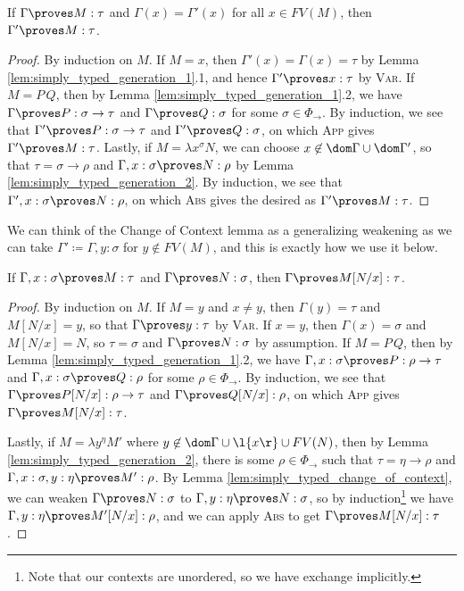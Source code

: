 \documentclass[reqno]{amsart}
\begin{document}
    \begin{lemma}\label{lem:simply_typed_change_of_context}
        If $\Gamma\proves M:\tau$ and $\Gamma(x)=\Gamma'(x)$ for all $x\in FV(M)$, then $\Gamma'\proves M:\tau$.
    \end{lemma}
    \begin{proof}
        By induction on $M$. If $M=x$, then $\Gamma'(x)=\Gamma(x)=\tau$ by Lemma \ref{lem:simply_typed_generation_1}.1, and hence $\Gamma'\proves x:\tau$ by \textsc{Var}. If $M=P\,Q$, then by Lemma \ref{lem:simply_typed_generation_1}.2, we have $\Gamma\proves P:\sigma\rightarrow\tau$ and $\Gamma\proves Q:\sigma$ for some $\sigma\in\Phi_\rightarrow$. By induction, we see that $\Gamma'\proves P:\sigma\to\tau$ and $\Gamma'\proves Q:\sigma$, on which \textsc{App} gives $\Gamma'\proves M:\tau$. Lastly, if $M=\lambda x^\sigma N$, we can choose $x\not\in\dom\Gamma\cup\dom\Gamma'$, so that $\tau=\sigma\rightarrow\rho$ and $\Gamma,x:\sigma\proves N:\rho$ by Lemma \ref{lem:simply_typed_generation_2}. By induction, we see that $\Gamma',x:\sigma\proves N:\rho$, on which \textsc{Abs} gives the desired as $\Gamma'\proves M:\tau$.
    \end{proof}

    We can think of the Change of Context lemma as a generalizing weakening as we can take $\Gamma'\coloneqq\Gamma,y:\sigma$ for $y\not\in FV(M)$, and this is exactly how we use it below.

    \begin{lemma}\label{lem:simply_typed_substitution}
        If $\Gamma,x:\sigma\proves M:\tau$ and $\Gamma\proves N:\sigma$, then $\Gamma\proves M[N/x]:\tau$.
    \end{lemma}
    \begin{proof}
        By induction on $M$. If $M=y$ and $x\neq y$, then $\Gamma(y)=\tau$ and $M[N/x]=y$, so that $\Gamma\proves y:\tau$ by \textsc{Var}. If $x=y$, then $\Gamma(x)=\sigma$ and $M[N/x]=N$, so $\tau=\sigma$ and $\Gamma\proves N:\sigma$ by assumption. If $M=P\,Q$, then by Lemma \ref{lem:simply_typed_generation_1}.2, we have $\Gamma,x:\sigma\proves P:\rho\rightarrow\tau$ and $\Gamma,x:\sigma\proves Q:\rho$ for some $\rho\in\Phi_\rightarrow$. By induction, we see that $\Gamma\proves P[N/x]:\rho\to\tau$ and $\Gamma\proves Q[N/x]:\rho$, on which \textsc{App} gives $\Gamma\proves M[N/x]:\tau$.

        Lastly, if $M=\lambda y^\eta M'$ where $y\not\in\dom\Gamma\cup\l\{x\r\}\cup FV(N)$, then by Lemma \ref{lem:simply_typed_generation_2}, there is some $\rho\in\Phi_\rightarrow$ such that $\tau=\eta\rightarrow\rho$ and $\Gamma,x:\sigma,y:\eta\proves M':\rho$. By Lemma \ref{lem:simply_typed_change_of_context}, we can weaken $\Gamma\proves N:\sigma$ to $\Gamma,y:\eta\proves N:\sigma$, so by induction\footnote{Note that our contexts are unordered, so we have exchange implicitly.} we have $\Gamma,y:\eta\proves M'[N/x]:\rho$, and we can apply \textsc{Abs} to get $\Gamma\proves M[N/x]:\tau$.
    \end{proof}
\end{document}
